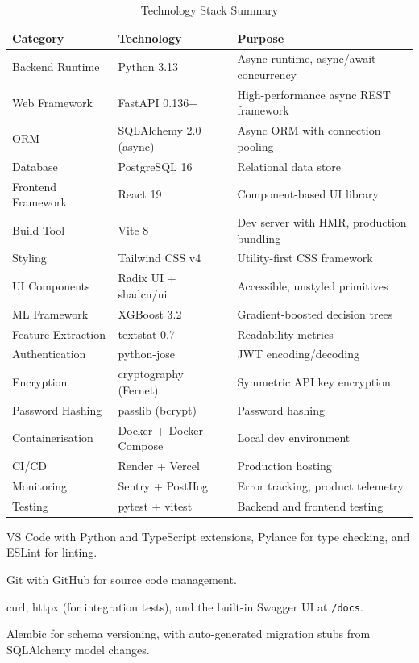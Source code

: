 \documentclass[12pt,a4paper]{report}
\begin{document}
\begin{table}[H]
    \centering
    \caption{Technology Stack Summary}
    \label{tab:techstack}
    \begin{tabularx}{\textwidth}{l l X}
    \toprule
    \textbf{Category} & \textbf{Technology} & \textbf{Purpose} \\
    \midrule
    Backend Runtime & Python 3.13 & Async runtime, async/await concurrency \\
    Web Framework & FastAPI 0.136+ & High-performance async REST framework \\
    ORM & SQLAlchemy 2.0 (async) & Async ORM with connection pooling \\
    Database & PostgreSQL 16 & Relational data store \\
    \rowcolor{gray!10}
    Frontend Framework & React 19 & Component-based UI library \\
    Build Tool & Vite 8 & Dev server with HMR, production bundling \\
    Styling & Tailwind CSS v4 & Utility-first CSS framework \\
    UI Components & Radix UI + shadcn/ui & Accessible, unstyled primitives \\
    \rowcolor{gray!10}
    ML Framework & XGBoost 3.2 & Gradient-boosted decision trees \\
    Feature Extraction & textstat 0.7 & Readability metrics \\
    Authentication & python-jose & JWT encoding/decoding \\
    \rowcolor{gray!10}
    Encryption & cryptography (Fernet) & Symmetric API key encryption \\
    Password Hashing & passlib (bcrypt) & Password hashing \\
    Containerisation & Docker + Docker Compose & Local dev environment \\
    CI/CD & Render + Vercel & Production hosting \\
    \rowcolor{gray!10}
    Monitoring & Sentry + PostHog & Error tracking, product telemetry \\
    Testing & pytest + vitest & Backend and frontend testing \\
    \bottomrule
    \end{tabularx}
\end{table}

\begin{description}[nosep]
    \item[IDE:] VS Code with Python and TypeScript extensions, Pylance for type checking, and ESLint for linting.
    \item[Version Control:] Git with GitHub for source code management.
    \item[API Testing:] curl, httpx (for integration tests), and the built-in Swagger UI at \texttt{/docs}.
    \item[Database Migration:] Alembic for schema versioning, with auto-generated migration stubs from SQLAlchemy model changes.
\end{description}
\end{document}
